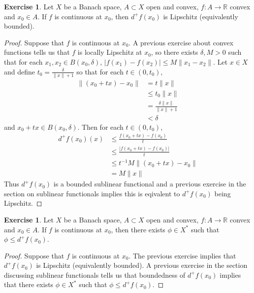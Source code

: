 \documentclass[12pt]{amsart}
\theoremstyle{definition}
\newtheorem{ex}[definition]{Exercise}
\newcommand{\del}{\delta}
\newcommand{\R}{\mathbb{R}}
\DeclareMathOperator*{\0}{\mbf{0}}
\DeclareMathOperator*{\1}{\mbf{1}}
\newcommand{\lex}[1]{\label{ex:#1}}
\begin{document}
	\begin{ex} \lex{}
	Let $X$ be a Banach space, $A \subset X$ open and convex, $f:A \rightarrow \R$ convex and $x_0 \in A$. If $f$ is continuous at $x_0$, then $d^+f(x_0)$ is Lipschitz (equivalently bounded). 
	\end{ex}	
	
	\begin{proof}
	Suppose that $f$ is continuous at $x_0$. A previous exercise about convex functions tells us that $f$ is locally Lipschitz at $x_0$, so there exists $\del,M >0$ such that for each $x_1, x_2 \in B(x_0, \del)$, $|f(x_1) - f(x_2)| \leq M\|x_1 - x_2\|$. Let $x \in X$ and define $t_0 = \frac{\del}{\|x\| + 1}$ so that for each $t \in (0, t_0)$,
	\begin{align*}
	\|(x_0 +tx) - x_0\|
	& = t\|x\| \\
	& \leq t_0 \| x\| \\
	&= \frac{\del \| x\|}{\|x\| + 1} \\
	& < \del
	\end{align*}  
	and $x_0 +tx \in B(x_0, \del)$.
	Then for each $t \in (0, t_0)$, 
	\begin{align*}
	d^+f(x_0)(x) 
	& \leq \frac{f(x_0 + tx) - f(x_0)}{t} \\
	& \leq \frac{|f(x_0 + tx) - f(x_0)|}{t} \\
	& \leq t^{-1}M \| (x_0 + tx) - x_0\| \\
	&= M\|x\|
	\end{align*}
	Thus $d^+f(x_0)$ is a bounded sublinear functional and  a previous exercise in the section on sublinear functionals implies this is eqivalent to $d^+f(x_0)$ being Lipschitz.
	\end{proof}
	
	\begin{ex} \lex{}
	Let $X$ be a Banach space, $A \subset X$ open and convex, $f:A \rightarrow \R$ convex and $x_0 \in A$. If $f$ is continuous at $x_0$, then there exists $\phi \in X^*$ such that $\phi \leq d^+f(x_0)$.
	\end{ex}	
	
	\begin{proof}
	Suppose that $f$ is continuous at $x_0$. The previous exercise implies that $d^+f(x_0)$ is Lipschitz (equivalently bounded). A previous exercise in the section discussing sublinear functionals tells us that boundedness of $d^+f(x_0)$ implies that there exists $\phi \in X^*$ such that $\phi \leq d^+f(x_0)$.
	\end{proof}
	
\end{document}
